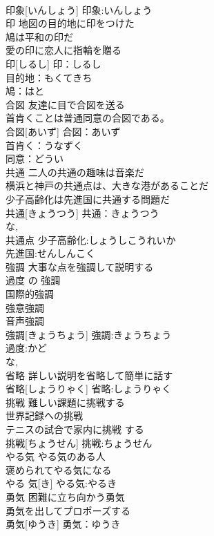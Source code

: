 \documentclass[8pt]{extreport}
\begin{document}
\begin{CJK}{UTF8}{min}
\\	印象[いんしょう]			印象:いんしょう
\\	印	地図の目的地に印をつけた 
\\	鳩は平和の印だ 
\\	愛の印に恋人に指輪を贈る 
\\	印[しるし]			印：しるし
\\	目的地：もくてきち
\\	鳩：はと
\\	合図	友達に目で合図を送る 
\\	首肯くことは普通同意の合図である。 
\\	合図[あいず]			合図：あいず
\\	首肯く：うなずく
\\	同意：どうい 
\\	共通	二人の共通の趣味は音楽だ 
\\	横浜と神戸の共通点は、大きな港があることだ 
\\	少子高齢化は先進国に共通する問題だ 
\\	共通[きょうつう]			共通：きょうつう
\\	な, 
\\	共通点 少子高齢化:しょうしこうれいか
\\	先進国:せんしんこく
\\	強調	大事な点を強調して説明する 
\\	過度 の 強調 
\\	国際的強調 
\\	強意強調 
\\	音声強調 
\\	強調[きょうちょう]			強調:きょうちょう
\\	過度:かど
\\	な, 
\\	省略	詳しい説明を省略して簡単に話す 
\\	省略[しょうりゃく]			省略:しょうりゃく
\\	挑戦	難しい課題に挑戦する 
\\	世界記録への挑戦 
\\	テニスの試合で家内に挑戦 する 
\\	挑戦[ちょうせん]			挑戦:ちょうせん
\\	やる気	やる気のある人 
\\	褒められてやる気になる 
\\	やる 気[き]			やる気:やるき
\\	勇気	困難に立ち向かう勇気 
\\	勇気を出してプロポーズする 
\\	勇気[ゆうき]			勇気：ゆうき

\end{CJK}
\end{document}
